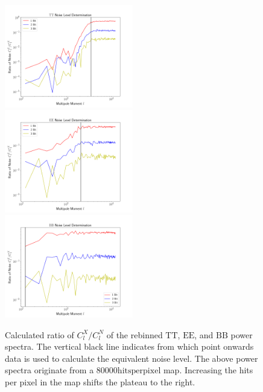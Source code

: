\documentclass[apj]{emulateapj}
\begin{document}
\begin{figure}[htb]\centering
\includegraphics[width=0.5\textwidth,clip]{Plots/ttratio.png}
\includegraphics[width=0.5\textwidth,clip]{Plots/eeratio.png}
\includegraphics[width=0.5\textwidth,clip]{Plots/bbratio.png}
  \caption[Current ]{
  Calculated ratio of $C_l^X/C_l^N$ of the rebinned $\mathrm{TT}$, $\mathrm{EE}$, and $\mathrm{BB}$ power spectra. The vertical black line indicates from which point onwards data is used to calculate the equivalent noise level. The above power spectra originate from a $80000\mathrm{hits per pixel}$ map. Increasing the hits per pixel in the map shifts the plateau to the right.
\label{fig:clxcln}
}
\end{figure}
\end{document}
